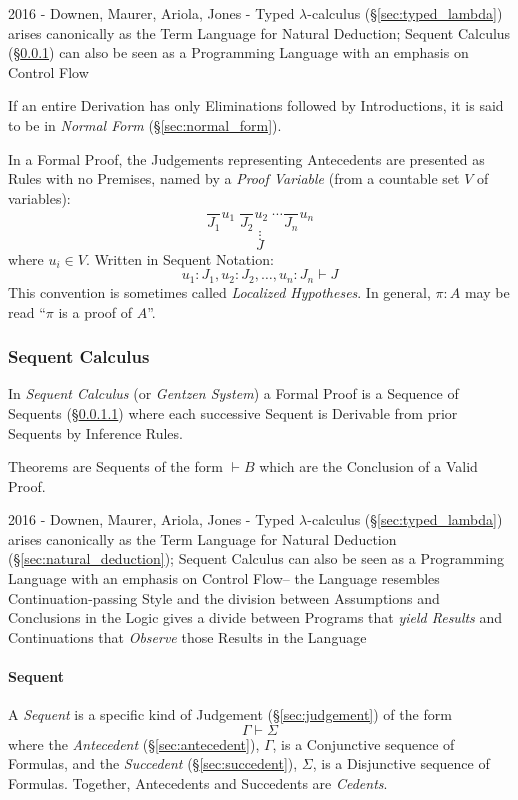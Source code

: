 2016 - Downen, Maurer, Ariola, Jones - Typed $\lambda$-calculus
(\S\ref{sec:typed_lambda}) arises canonically as the Term Language for Natural
Deduction; Sequent Calculus (\S\ref{sec:sequent_calculus}) can also be seen as a
Programming Language with an emphasis on Control Flow

If an entire Derivation has only Eliminations followed by
Introductions, it is said to be in \emph{Normal Form}
(\S\ref{sec:normal_form}).

In a Formal Proof, the Judgements representing Antecedents are
presented as Rules with no Premises, named by a \emph{Proof Variable}
(from a countable set $V$ of variables):
\[
  \frac{}{J_1}u_1 \; \frac{}{J_2}u_2 \; \cdots \frac{}{J_n}u_n
\]\[
  \vdots
\]\[
  J
\]
where $u_i \in V$. Written in Sequent Notation:
\[
  u_1:J_1, u_2:J_2, \ldots, u_n:J_n \vdash J
\]
This convention is sometimes called \emph{Localized Hypotheses}. In
general, $\pi : A$ may be read ``$\pi$ is a proof of $A$''.



\subsubsection{Sequent Calculus}\label{sec:sequent_calculus}

In \emph{Sequent Calculus} (or \emph{Gentzen System}) a Formal Proof
is a Sequence of Sequents (\S\ref{sec:sequent}) where each
successive Sequent is Derivable from prior Sequents by Inference
Rules.

Theorems are Sequents of the form $\vdash B$ which are the Conclusion
of a Valid Proof.

2016 - Downen, Maurer, Ariola, Jones - Typed $\lambda$-calculus
(\S\ref{sec:typed_lambda}) arises canonically as the Term Language for Natural
Deduction (\S\ref{sec:natural_deduction}); Sequent Calculus can also be seen as
a Programming Language with an emphasis on Control Flow-- the Language
resembles Continuation-passing Style and the division between Assumptions and
Conclusions in the Logic gives a divide between Programs that \emph{yield
  Results} and Continuations that \emph{Observe} those Results in the Language



\paragraph{Sequent}\label{sec:sequent}\hfill

A \emph{Sequent} is a specific kind of Judgement
(\S\ref{sec:judgement}) of the form
\[
  \Gamma \vdash \Sigma
\]
where the \emph{Antecedent} (\S\ref{sec:antecedent}), $\Gamma$, is a
Conjunctive sequence of Formulas, and the \emph{Succedent}
(\S\ref{sec:succedent}), $\Sigma$, is a Disjunctive sequence of
Formulas. Together, Antecedents and Succedents are \emph{Cedents}.

